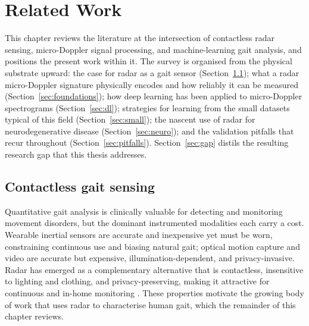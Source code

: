 
\chapter{Related Work}
\label{ch:related}

This chapter reviews the literature at the intersection of contactless radar
sensing, micro-Doppler signal processing, and machine-learning gait analysis,
and positions the present work within it. The survey is organised from the
physical substrate upward: the case for radar as a gait sensor
(Section~\ref{sec:contactless}); what a radar micro-Doppler signature physically
encodes and how reliably it can be measured
(Section~\ref{sec:foundations}); how deep learning has been applied to
micro-Doppler spectrograms (Section~\ref{sec:dl}); strategies for learning from
the small datasets typical of this field (Section~\ref{sec:small}); the nascent
use of radar for neurodegenerative disease
(Section~\ref{sec:neuro}); and the validation pitfalls that recur throughout
(Section~\ref{sec:pitfalls}). Section~\ref{sec:gap} distils the resulting
research gap that this thesis addresses.

\section{Contactless gait sensing}
\label{sec:contactless}

Quantitative gait analysis is clinically valuable for detecting and monitoring
movement disorders, but the dominant instrumented modalities each carry a cost.
Wearable inertial sensors are accurate and inexpensive yet must be worn,
constraining continuous use and biasing natural gait; optical motion capture and
video are accurate but expensive, illumination-dependent, and privacy-invasive.
Radar has emerged as a complementary alternative that is contactless,
insensitive to lighting and clothing, and privacy-preserving, making it
attractive for continuous and in-home monitoring
\cite{seifert2020,gurbuz2024,alanazi2022}. These properties motivate the growing
body of work that uses radar to characterise human gait, which the remainder of
this chapter reviews.

